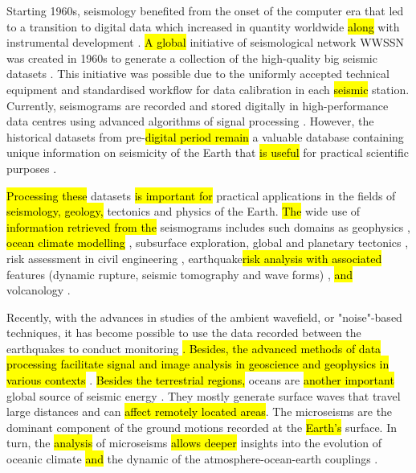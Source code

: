 \documentclass[sensors,article,submit,moreauthors,pdftex]{Definitions/mdpi}
\begin{document}
Starting 1960s, seismology benefited from the\hl{ }onset of the computer era that led to a transition to digital data which\hl{ }increased in quantity worldwide \hl{along }with instrumental development \cite{Engdahl2002}. \hl{A global }initiative of seismological network \ac{WWSSN} was created in 1960s to generate a collection of the high-quality big seismic datasets \citep{OliverMurphy,Ammon2010}. This initiative was possible due to the uniformly accepted technical equipment and standardised workflow for data calibration in each \hl{seismic }station. Currently, seismograms are recorded and stored digitally in high-performance data centres using advanced algorithms of signal processing \cite{Heiner}. However, the\hl{ }historical datasets from pre-\hl{digital period remain }a valuable database containing unique information on seismicity of the Earth that \hl{is useful }for practical scientific purposes \cite{Kanamorietal2010,Bungum,Kanamorietal2019,Lomnitz2004,Ambraseys1983}. 

\hl{Processing these} datasets \hl{is important for} practical applications\hl{ }in the fields of \hl{seismology, geology, }tectonics and\hl{ }physics of the Earth. \hl{The }wide use of \hl{information retrieved from the }seismograms\hl{ }\cite{Ammon2021} includes such\hl{ }domains as geophysics \cite{Kulhanek}, \hl{ocean climate modelling} \cite{Lecocqetal2020}, subsurface exploration, global and planetary tectonics \citep{Crampin,Jackson2002,Leroyetal2010}, risk assessment in civil engineering \citep{Phillips,Pileckietal2017, Kurzeja},\hl{ }earthquake\hl{risk analysis with associated }features (dynamic rupture, seismic tomography and wave forms) \cite{Ahorner,Steinmann,Amorese,Lomnitz,Yuliatmoko},\hl{ and }volcanology \cite{Pezzo}. 

Recently, with the advances in studies of the ambient wavefield, or "noise"-based techniques, it has become possible to use the data recorded between the earthquakes to conduct monitoring \cite{Ratdomopurbo,Mordret,LemenkovaDebeir02}\hl{. Besides, the advanced methods of data processing facilitate signal and image analysis in geoscience and geophysics in various contexts} \cite{brenguier2014mapping,Lemenkova202012,Braszusetal2021,LemenkovaDebeir01,Lemenkova202016,Lietal2000}. \hl{Besides the terrestrial regions, }oceans are \hl{another important }global source of seismic energy \cite{Ardhuinetal2011,AucanArdhuin2013,PeureuxArdhuin2016}. They mostly generate surface waves that travel large distances and can \hl{affect remotely located areas}. The microseisms\hl{ }are the dominant component of the ground motions recorded at the \hl{Earth's }surface. In turn, the \hl{analysis }of microseisms \hl{allows deeper} insights into the evolution of oceanic climate \cite{Singh2021,Toyokunietal2015} \hl{and }the dynamic of the atmosphere-ocean-earth couplings \cite{Bromirski1999,Williams,Ardhuinetal2011}. 
\end{document}

